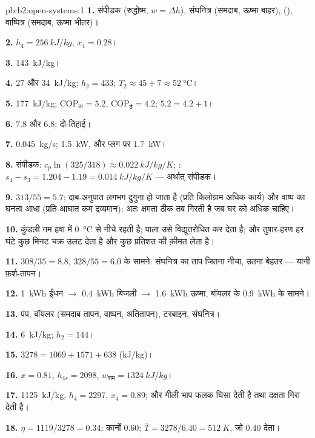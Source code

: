 \begin{solution}{pb:b2:open-systems:1}
\textbf{1.} संपीडक (रुद्धोष्म, $w = \Delta h$), संघनित्र (समदाब, ऊष्मा
बाहर),  (), वाष्पित्र (समदाब, ऊष्मा भीतर)।

\textbf{2.} $h_4 = \qty{256}{kJ/kg}$, $x_4 = 0.28$।

\textbf{3.} \qty{143}{kJ/kg}।

\textbf{4.} \qty{27}{} और \qty{34}{kJ/kg}; $h_2 = 433$; $T_2 \approx 45 + 7 \approx
\qty{52}{\celsius}$।

\textbf{5.} \qty{177}{kJ/kg}; $\mathrm{COP}_{\text{ता}} = 5.2$, $\mathrm{COP}_{\text{ठं}} = 4.2$;
$5.2 = 4.2 + 1$।

\textbf{6.} $7.8$ और $6.8$; दो-तिहाई।

\textbf{7.} \qty{0.045}{kg/s}; \qty{1.5}{kW}, और प्लग पर \qty{1.7}{kW}।

\textbf{8.} संपीडक: $c_p\ln(325/318) \approx \qty{0.022}{kJ/kg/K}$;
: $s_4 - s_3 = 1.204 - 1.19 = \qty{0.014}{kJ/kg/K}$ --- अर्थात् संपीडक।

\textbf{9.} $313/55 = 5.7$; दाब-अनुपात लगभग दुगुना हो जाता है (प्रति किलोग्राम
अधिक कार्य) और वाष्प का घनत्व आधा (प्रति आघात कम द्रव्यमान):
अतः क्षमता ठीक तब गिरती है जब घर को अधिक चाहिए।

\textbf{10.} कुंडली नम हवा में \qty{0}{\celsius} से नीचे रहती है; पाला
उसे विद्युतरोधित कर देता है; और तुषार-हरण हर घंटे कुछ मिनट चक्र उलट देता है और
कुछ प्रतिशत की क़ीमत लेता है।

\textbf{11.} $308/35 = 8.8$, $328/55 = 6.0$ के सामने: संघनित्र का ताप
जितना नीचा, उतना बेहतर --- यानी फ़र्श-तापन।

\textbf{12.} \qty{1}{kWh} ईंधन $\to$ \qty{0.4}{kWh} बिजली $\to$
\qty{1.6}{kWh} ऊष्मा, बॉयलर के \qty{0.9}{kWh} के सामने।

\textbf{13.} पंप, बॉयलर (समदाब तापन, वाष्पन, अतितापन),
टरबाइन, संघनित्र।

\textbf{14.} \qty{6}{kJ/kg}; $h_2 = 144$।

\textbf{15.} $3278 = 1069 + 1571 + 638$ (\unit{kJ/kg})।

\textbf{16.} $x = 0.81$, $h_{4s} = 2098$, $w_{\text{सम}} = \qty{1324}{kJ/kg}$।

\textbf{17.} \qty{1125}{kJ/kg}, $h_4 = 2297$, $x_4 = 0.89$; और गीली भाप फलक घिसा देती
है तथा दक्षता गिरा देती है।

\textbf{18.} $\eta = 1119/3278 = 0.34$; कार्नो $0.60$; $\bar T = 3278/6.40 =
\qty{512}{K}$, जो $0.40$ देता।


\end{solution}
